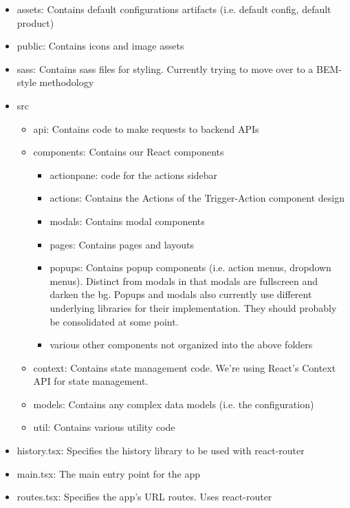 \begin{itemize}
\tightlist
\item
  assets: Contains default configurations artifacts (i.e. default
  config, default product)
\item
  public: Contains icons and image assets
\item
  sass: Contains sass files for styling. Currently trying to move over
  to a BEM-style methodology
\item
  src

  \begin{itemize}
  \item
    api: Contains code to make requests to backend APIs
  \item
    components: Contains our React components

    \begin{itemize}
    \tightlist
    \item
      actionpane: code for the actions sidebar
    \item
      actions: Contains the Actions of the Trigger-Action component
      design
    \item
      modals: Contains modal components
    \item
      pages: Contains pages and layouts
    \item
      popups: Contains popup components (i.e. action menus, dropdown
      menus). Distinct from modals in that modals are fullscreen and
      darken the bg. Popups and modals also currently use different
      underlying libraries for their implementation. They should
      probably be consolidated at some point.
    \item
      various other components not organized into the above folders
    \end{itemize}
  \item
    context: Contains state management code. We're using React's Context
    API for state management.
  \item
    models: Contains any complex data models (i.e. the configuration)
  \item
    util: Contains various utility code
  \end{itemize}
\item
  history.tsx: Specifies the history library to be used with
  react-router
\item
  main.tsx: The main entry point for the app
\item
  routes.tsx: Specifies the app's URL routes. Uses react-router
\end{itemize}

